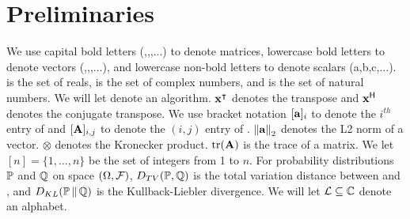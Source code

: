 

\section{Preliminaries}
\label{sec:prelims}

We use capital bold letters (\mA,\mB,\mC,...) to denote matrices, lowercase bold letters to denote vectors (\va,\vb,\vc,...), and lowercase non-bold letters to denote scalars (a,b,c,...).
\bbR is the set of reals, \bbC is the set of complex numbers, and \bbN is the set of natural numbers.
We will let \cA denote an algorithm.
\(\boldsymbol{\mathrm{x}}^\intercal\) denotes the transpose and \(\boldsymbol{\mathrm{x}}^{\textsf{\upshape H}}\) denotes the conjugate transpose.
We use bracket notation \([\boldsymbol{\mathrm{a}}]_{i}\) to denote the \(i^{th}\) entry of \va and \([\mathbf{A}]_{i,j}\) to denote the \((i,j)\) entry of \mA.
\(\norm{\va}_2\) denotes the L2 norm of a vector.
\(\otimes\) denotes the Kronecker product.
\(\operatorname{tr}(\mathbf{A})\) is the trace of a matrix.
We let \([n] = \{1,\ldots,n\}\) be the set of integers from 1 to \(n\).
For probability distributions \({\mathbb P}\) and \({\mathbb Q}\) on space \((\Omega,{\mathcal F})\), \(D_{TV}({\mathbb P},{\mathbb Q})\) is the total variation distance between \bbP and \bbQ, and \(D_{KL}({\mathbb P}\,\|\,{\mathbb Q})\) is the Kullback-Liebler divergence.
We will let \({\mathcal L} \subseteq {\mathbb C}\) denote an alphabet.
